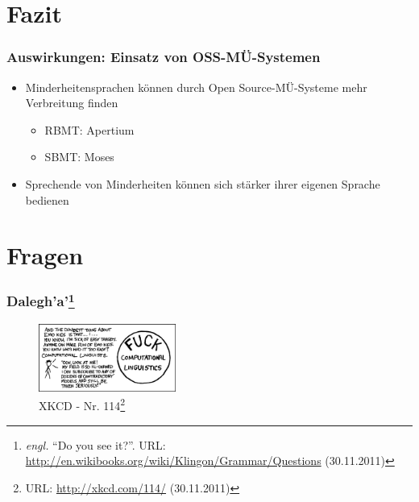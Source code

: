 \documentclass{beamer}
\begin{document}
\section{Fazit}
\begin{frame}
\frametitle{Auswirkungen: Einsatz von OSS-MÜ-Systemen}
\begin{itemize}
\item Minderheitensprachen können durch Open Source-MÜ-Systeme mehr Verbreitung finden
 \begin{itemize}
 \item RBMT: Apertium
 \item SBMT: Moses
 \end{itemize}
\item Sprechende von Minderheiten können sich stärker ihrer eigenen Sprache bedienen
\end{itemize}
\end{frame}
\section{Fragen}
\begin{frame}
  \frametitle{Dalegh'a'\footnote{\emph{engl.} ``Do you see it?''. URL: \url{http://en.wikibooks.org/wiki/Klingon/Grammar/Questions} (30.11.2011)}}
  \begin{figure}
  \includegraphics[width=0.40\textwidth]{graphics/xkcd--cl}
  \caption{XKCD - Nr. 114\footnote{URL: \url{http://xkcd.com/114/} (30.11.2011)}}
  \end{figure}
\end{frame}
\end{document}

